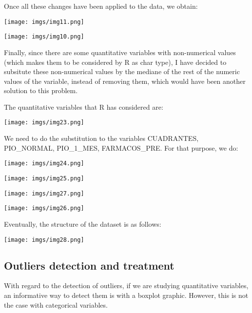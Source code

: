 \documentclass{article}
\begin{document}
Once all these changes have been applied to the data, we obtain:

\begin{center}
    {\texttt{[image: imgs/img11.png]}\par}
    {\texttt{[image: imgs/img10.png]}\par}
\end{center}

Finally, since there are some quantitative variables with non-numerical values (which makes them to be 
considered by R as char type), I have decided to subsitute these non-numerical values by the mediane of 
the rest of the numeric values of the variable, instead of removing them, which would have been another
solution to this problem.

The quantitative variables that R has considered are:

\begin{center}
    {\texttt{[image: imgs/img23.png]}\par}
\end{center}

We need to do the substitution to the variables  CUADRANTES, PIO\_NORMAL, PIO\_1\_MES, FARMACOS\_PRE. For that purpose, we do:

\begin{center}
    {\texttt{[image: imgs/img24.png]}\par}
    {\texttt{[image: imgs/img25.png]}\par}
    {\texttt{[image: imgs/img27.png]}\par}
    {\texttt{[image: imgs/img26.png]}\par}
\end{center}

Eventually, the structure of the dataset is as follows:

\begin{center}
    {\texttt{[image: imgs/img28.png]}\par}
\end{center}

\subsection{Outliers detection and treatment}

With regard to the detection of outliers, if we are studying quantitative variables, an informative
way to detect them is with a boxplot graphic. However, this is not the case with categorical 
variables.
\end{document}
